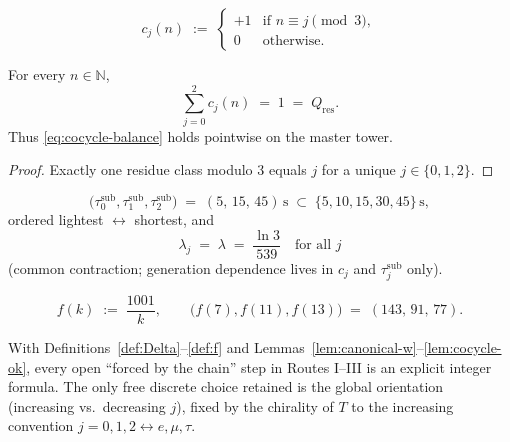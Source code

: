 \begin{definition}
\label{def:c-explicit}
\begin{equation}
\label{eq:c-explicit}
c_j(n) \;:=\;
\begin{cases}
+1 & \text{if } n\equiv j \pmod{3},\\
0 & \text{otherwise}.
\end{cases}
\end{equation}
\end{definition}

\begin{lemma}
\label{lem:cocycle-ok}
For every \(n\in\mathbb{N}\),
\[
\sum_{j=0}^{2} c_j(n) \;=\; 1 \;=\; Q_{\mathrm{res}}.
\]
Thus \eqref{eq:cocycle-balance} holds pointwise on the master tower.
\end{lemma}

\begin{proof}
Exactly one residue class modulo 3 equals \(j\) for a unique \(j\in\{0,1,2\}\).
\end{proof}

\begin{definition}
\label{def:sub-explicit}
\begin{equation}
\label{eq:sub-explicit}
\bigl(\tau_0^{\mathrm{sub}},\tau_1^{\mathrm{sub}},\tau_2^{\mathrm{sub}}\bigr)
\;=\;
(5,\,15,\,45)\,\mathrm{s}
\;\subset\;
\{5,10,15,30,45\}\,\mathrm{s},
\end{equation}
ordered lightest \(\leftrightarrow\) shortest, and
\begin{equation}
\label{eq:lambda-explicit}
\lambda_j \;=\; \lambda \;=\; \frac{\ln 3}{539}
\quad\text{for all }j
\end{equation}
(common contraction; generation dependence lives in \(c_j\) and
\(\tau_j^{\mathrm{sub}}\) only).
\end{definition}

\begin{definition}
\label{def:f}
\begin{equation}
\label{eq:f}
f(k) \;:=\; \frac{1001}{k},
\qquad
\bigl(f(7),f(11),f(13)\bigr) \;=\; (143,\,91,\,77).
\end{equation}
\end{definition}

\begin{theorem}
\label{thm:closure}
With Definitions~\ref{def:Delta}--\ref{def:f} and
Lemmas~\ref{lem:canonical-w}--\ref{lem:cocycle-ok}, every open ``forced by the
chain'' step in Routes I--III is an explicit integer formula. The only free
discrete choice retained is the global orientation
(increasing vs.\ decreasing \(j\)), fixed by the chirality of \(T\) to the
increasing convention \(j=0,1,2\leftrightarrow e,\mu,\tau\).
\end{theorem}

